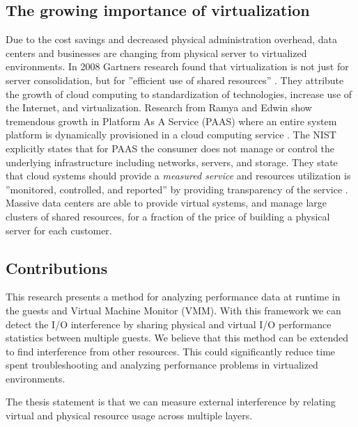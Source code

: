 \subsection{The growing importance of virtualization}
Due to the cost savings and decreased physical administration overhead, data centers and businesses are changing from physical server to virtualized environments. In 2008 Gartners research found that virtualization is not just for server consolidation, but for ”efficient use of shared resources” \cite{gartners}.  They attribute the growth of cloud computing to standardization of technologies, increase use of the Internet, and virtualization.  Research from Ramya and Edwin show tremendous growth in Platform As A Service (PAAS) where an entire system platform is dynamically provisioned in a cloud computing service \cite{ramya}. The NIST explicitly states that for PAAS the consumer does not manage or control the underlying infrastructure including networks, servers, and storage. They state that cloud systems should provide a \emph{measured service} and resources utilization is ”monitored, controlled, and reported” by providing transparency of the service \cite{nist}.  Massive data centers are able to provide virtual systems, and manage large clusters of shared resources, for a fraction of the price of building a physical server for each customer.

\subsection{Contributions}
This research presents a method for analyzing performance data at runtime in the guests and Virtual Machine Monitor (VMM).   With this framework we can detect the I/O interference by sharing physical and virtual I/O performance statistics between multiple guests.  We believe that this method can be extended to find interference from other resources.  This could significantly reduce time spent troubleshooting and analyzing performance problems in virtualized environments.
\newline

The thesis statement is that we can measure external interference by relating virtual and physical resource usage across multiple layers.
\newline

